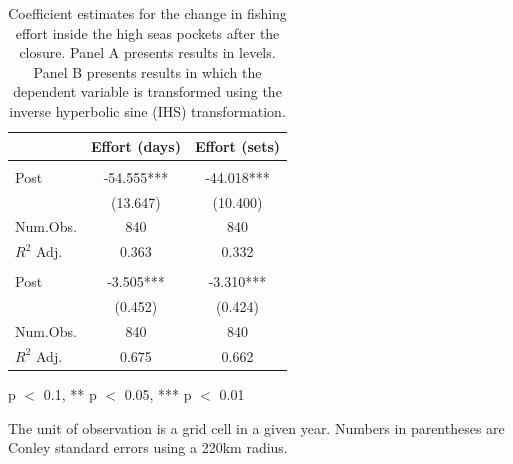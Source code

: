 \begin{table}
\centering
\begin{threeparttable}
\small
\caption{\label{tab:h1_self}Coefficient estimates for the change in fishing
             effort inside the high seas pockets after the closure.
             Panel A presents results in levels. Panel B presents results in
             which the dependent variable is transformed using the inverse
             hyperbolic sine (IHS) transformation.}
\centering
\begin{tabular}[t]{lcc}
\toprule
  & Effort (days) & Effort (sets)\\
\midrule
\addlinespace[0.5em]
\multicolumn{3}{l}{\textit{A) Levels}}\\
\midrule \hspace{1em}Post & -54.555*** & -44.018***\\
\hspace{1em} & (13.647) & (10.400)\\
\hspace{1em}Num.Obs. & 840 & \vphantom{1} 840\\
\hspace{1em}$R^2$ Adj. & 0.363 & 0.332\\
\addlinespace[0.5em]
\multicolumn{3}{l}{\textit{B) Inverse-hyperbolic sine transformation}}\\
\midrule \hspace{1em}Post & -3.505*** & -3.310***\\
\hspace{1em} & (0.452) & (0.424)\\
\hspace{1em}Num.Obs. & 840 & 840\\
\hspace{1em}$R^2$ Adj. & 0.675 & 0.662\\
\bottomrule
\end{tabular}
\begin{tablenotes}
\small
\item * p $<$ 0.1, ** p $<$ 0.05, *** p $<$ 0.01
\item The unit of observation is a grid cell in a given year. Numbers in parentheses are Conley standard errors using a 220km radius.
\end{tablenotes}
\end{threeparttable}
\end{table}
